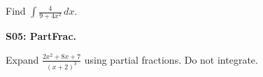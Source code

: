 \documentclass[12pt]{article}
\newcommand{\<}{\left\langle}
\renewcommand{\>}{\right\rangle}
\newcommand{\exerciseHeader}[4]{


  \vspace{0.5em}
  \textbf{#2}
  \vspace{0.5em}

}
\begin{document}
\begin{multicols}{2}
Find \(\displaystyle\int\frac{4}{9+4x^2}\,dx\).


%

%

%

%

\exerciseHeader{2017 June 15}{S05: PartFrac.}{
Use partial fractions to integrate rational functions.
}{2/3}

Expand \(\displaystyle\frac{2x^2+8x+7}{(x+2)^3}\) using partial fractions.
Do not integrate.



%

%

%

%

%

%


\end{multicols}
\end{document}
